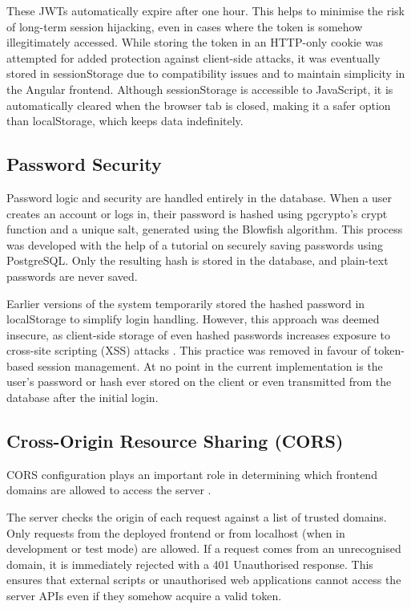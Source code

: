 \documentclass{l4proj}
\begin{document}
These JWTs automatically expire after one hour. This helps to minimise the risk of long-term session hijacking, even in cases where the token is somehow illegitimately accessed. While storing the token in an HTTP-only cookie was attempted for added protection against client-side attacks, it was eventually stored in sessionStorage due to compatibility issues and to maintain simplicity in the Angular frontend. Although sessionStorage is accessible to JavaScript, it is automatically cleared when the browser tab is closed, making it a safer option than localStorage, which keeps data indefinitely.

\subsection{Password Security}
Password logic and security are handled entirely in the database. When a user creates an account or logs in, their password is hashed using pgcrypto’s crypt function and a unique salt, generated using the Blowfish algorithm. This process was developed with the help of a \citet{vultr_passwords_postgresql} tutorial on securely saving passwords using PostgreSQL. Only the resulting hash is stored in the database, and plain-text passwords are never saved.

Earlier versions of the system temporarily stored the hashed password in localStorage to simplify login handling. However, this approach was deemed insecure, as client-side storage of even hashed passwords increases exposure to cross-site scripting (XSS) attacks \citep{owasp_html5}. This practice was removed in favour of token-based session management. At no point in the current implementation is the user’s password or hash ever stored on the client or even transmitted from the database after the initial login.

\subsection{Cross-Origin Resource Sharing (CORS) }
\label{sec:cors}
CORS configuration plays an important role in determining which frontend domains are allowed to access the server \citep{aws_cors}.

The server checks the origin of each request against a list of trusted domains. Only requests from the deployed frontend or from localhost (when in development or test mode) are allowed. If a request comes from an unrecognised domain, it is immediately rejected with a 401 Unauthorised response. This ensures that external scripts or unauthorised web applications cannot access the server APIs even if they somehow acquire a valid token.
\end{document}
